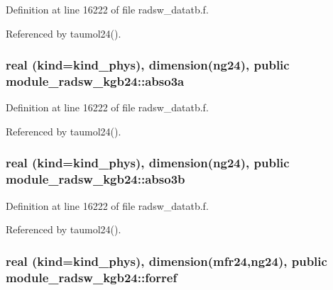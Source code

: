 Definition at line 16222 of file radsw\+\_\+datatb.\+f.



Referenced by taumol24().

\subsubsection[{\texorpdfstring{abso3a}{abso3a}}]{\setlength{\rightskip}{0pt plus 5cm}real (kind=kind\+\_\+phys), dimension(ng24), public module\+\_\+radsw\+\_\+kgb24\+::abso3a}\hypertarget{namespacemodule__radsw__kgb24_a3df78e9baa46df182aad6ff9b1662dc4}{}\label{namespacemodule__radsw__kgb24_a3df78e9baa46df182aad6ff9b1662dc4}


Definition at line 16222 of file radsw\+\_\+datatb.\+f.



Referenced by taumol24().

\subsubsection[{\texorpdfstring{abso3b}{abso3b}}]{\setlength{\rightskip}{0pt plus 5cm}real (kind=kind\+\_\+phys), dimension(ng24), public module\+\_\+radsw\+\_\+kgb24\+::abso3b}\hypertarget{namespacemodule__radsw__kgb24_a6b44aa0637523aa1f78de5b4d16c693b}{}\label{namespacemodule__radsw__kgb24_a6b44aa0637523aa1f78de5b4d16c693b}


Definition at line 16222 of file radsw\+\_\+datatb.\+f.



Referenced by taumol24().

\subsubsection[{\texorpdfstring{forref}{forref}}]{\setlength{\rightskip}{0pt plus 5cm}real (kind=kind\+\_\+phys), dimension({\bf mfr24},ng24), public module\+\_\+radsw\+\_\+kgb24\+::forref}\hypertarget{namespacemodule__radsw__kgb24_ac57357ab300edcbad8f7b3801b796af3}{}\label{namespacemodule__radsw__kgb24_ac57357ab300edcbad8f7b3801b796af3}


